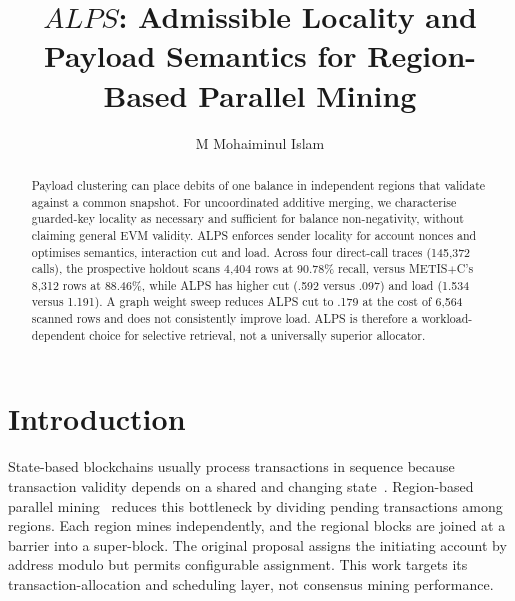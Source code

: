 \documentclass[runningheads]{llncs}
\newif\ifanonymous
\begin{document}
\title{$ALPS$: Admissible Locality and Payload Semantics for Region-Based Parallel Mining}

\ifanonymous
\author{Anonymous Author(s)}
\authorrunning{Anonymous Author(s)}
\institute{Anonymous Institution}
\else
\author{M Mohaiminul Islam}
\fi

\maketitle

\begin{abstract}
Payload clustering can place debits of one balance in independent regions that
validate against a common snapshot. For uncoordinated additive merging, we
characterise guarded-key locality as necessary and sufficient for balance
non-negativity, without claiming general EVM validity. ALPS enforces sender
locality for account nonces and optimises semantics, interaction cut and load.
Across four direct-call traces (145,372 calls), the prospective holdout scans
4,404 rows at 90.78\% recall, versus METIS$+$C's 8,312 rows at 88.46\%, while
ALPS has higher cut (.592 versus .097) and load (1.534 versus 1.191). A graph
weight sweep reduces ALPS cut to .179 at the cost of 6,564 scanned rows and
does not consistently improve load. ALPS is therefore a workload-dependent
choice for selective retrieval, not a universally superior allocator.
\end{abstract}


\section{Introduction}

State-based blockchains usually process transactions in sequence because transaction validity depends on a shared and changing state~\cite{wood2014}. Region-based parallel mining~\cite{chishti2021} reduces this bottleneck by dividing pending transactions among regions. Each region mines independently, and the regional blocks are joined at a barrier into a super-block. The original proposal assigns the initiating account by address modulo but permits configurable assignment. This work targets its transaction-allocation and scheduling layer, not consensus mining performance.
\end{document}
